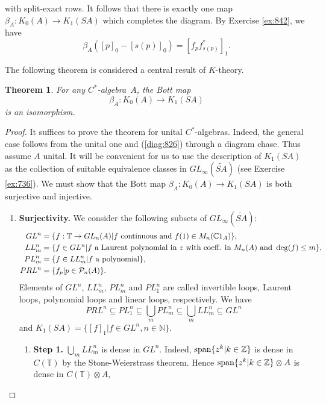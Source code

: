 \documentclass{book}
\newtheorem{theorem}[definition]{Theorem}
\def\cstar{\(C^*\)-algebra}
\def\cstars{\(C^*\)-algebras}
\begin{document}
with split-exact rows. It follows that there is exactly one map \(\beta_A:K_0(A)\rightarrow K_1(S A)\)
which completes the diagram. By Exercise \ref{ex:842}, we have 
\[
  \beta_A({[p]}_0-{[s(p)]}_0)={[f_p f^*_{s(p)}]}_1.
\]\par
The following theorem is considered a central result of \(K\)-theory.
\begin{theorem}\label{theorem:821}
  For any \cstar\ \(A\), the Bott map
  \[
    \beta_A:K_0(A)\rightarrow K_1(S A)
  \]
  is an isomorphism.
\end{theorem}
\begin{proof}
  It suffices to prove the theorem for unital \cstars. Indeed, the general case follows from the unital one and (\ref{diag:826}) through a diagram chase.
  Thus assume \(A\) unital. It will be convenient for us to use the description of \(K_1(S A)\) as the collection of suitable equivalence classes in \(GL_\infty(\widetilde{S A})\) (see Exercise \ref{ex:736}).
  We must show that the Bott map \(\beta_A:K_0(A)\rightarrow K_1(S A)\) is both surjective and injective.
  \begin{enumerate}[label={}]
    \item \textbf{Surjectivity.} We consider the following subsets of \(GL_\infty(\widetilde{S A})\):
    \begin{align*}
      GL^n&=\{f:\mathbb{T}\rightarrow GL_n(A)| f\textnormal{ continuous and }f(1)\in M_n(\mathbb{C}1_A)\},\\
      LL_m^n&=\{f\in GL^n| f\textnormal{ a Laurent polynomial in }z\textnormal{ with coeff. in }M_n(A)\textnormal{ and }\deg(f)\leq m\},\\
      PL_m^n&=\{f\in LL_m^n| f\textnormal{ a polynomial}\},\\
      PRL^n&=\{f_p| p\in\mathcal{P}_n(A)\}.
    \end{align*}
    Elements of \(GL^n\), \(LL_m^n\), \(PL_m^n\) and \(PL_1^n\) are called \textnormal{invertible loops, Laurent loops, polynomial loops} and \textnormal{linear loops}, respectively. We have
    \[
      PRL^n\subseteq PL_1^n\subseteq \bigcup_m PL_m^n\subseteq\bigcup_m LL_m^n\subseteq GL^n
    \]
    and \(K_1(S A)=\{{[f]}_1| f\in GL^n, n\in\mathbb{N}\}\).
    \begin{enumerate}[label={}]
      \item \textbf{Step 1.} \(\bigcup_m LL_m^n\) is dense in \(GL^n\). Indeed, \(\textnormal{span}\{z^k| k\in\mathbb{Z}\}\)
      is dense in \(C(\mathbb{T})\) by the Stone-Weierstrass theorem. Hence \(\textnormal{span}\{z^k| k\in\mathbb{Z}\}\otimes A\) is dense in \(C(\mathbb{T})\otimes A\),

\end{enumerate}
\end{enumerate}
\end{proof}
\end{document}
